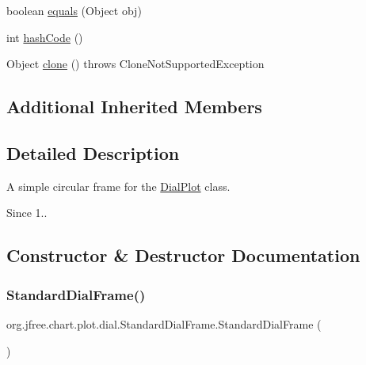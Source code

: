 \begin{DoxyCompactItemize}
\item 
boolean \mbox{\hyperlink{classorg_1_1jfree_1_1chart_1_1plot_1_1dial_1_1_standard_dial_frame_a4bdeeba7724573ccb60235903e8919ab}{equals}} (Object obj)
\item 
int \mbox{\hyperlink{classorg_1_1jfree_1_1chart_1_1plot_1_1dial_1_1_standard_dial_frame_a51700e94f82ad54d768647628ead4c20}{hash\+Code}} ()
\item 
Object \mbox{\hyperlink{classorg_1_1jfree_1_1chart_1_1plot_1_1dial_1_1_standard_dial_frame_ac16a8c59f505f44c9bdffcc9060a6e29}{clone}} ()  throws Clone\+Not\+Supported\+Exception 
\end{DoxyCompactItemize}
\subsection*{Additional Inherited Members}


\subsection{Detailed Description}
A simple circular frame for the \mbox{\hyperlink{classorg_1_1jfree_1_1chart_1_1plot_1_1dial_1_1_dial_plot}{Dial\+Plot}} class.

\begin{DoxySince}{Since}
1.. 
\end{DoxySince}


\subsection{Constructor \& Destructor Documentation}
\mbox{\label{classorg_1_1jfree_1_1chart_1_1plot_1_1dial_1_1_standard_dial_frame_ac0eae7cda55d623aff3d58b86230f54a}} 
\subsubsection{\texorpdfstring{Standard\+Dial\+Frame()}{StandardDialFrame()}}
{\footnotesize\ttfamily org.\+jfree.\+chart.\+plot.\+dial.\+Standard\+Dial\+Frame.\+Standard\+Dial\+Frame (\begin{DoxyParamCaption}{ }\end{DoxyParamCaption})}

